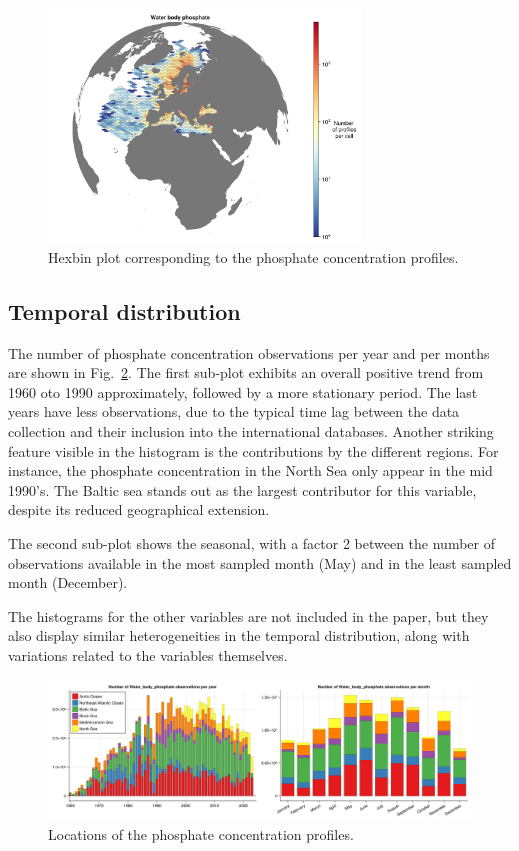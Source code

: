 \documentclass[essd,manuscript]{copernicus}
\begin{document}
\begin{figure}[t]
\includegraphics[width=8.3cm]{observations_Water_body_phosphate_hex.png}
\caption{Hexbin plot corresponding to the phosphate concentration profiles.\label{fig:phosphatedatahexbin}}
\end{figure}

\subsection{Temporal distribution}

The number of phosphate concentration observations per year and per months are shown in Fig.~\ref{fig:phosphatetime}. The first sub-plot exhibits an overall positive trend from 1960 oto 1990 approximately, followed by a more stationary period. The last years have less observations, due to the typical time lag between the data collection and their inclusion into the international databases. Another striking feature visible in the histogram is the contributions by the different regions. For instance, the phosphate concentration in the North Sea only appear in the mid 1990's. The Baltic sea stands out as the largest contributor for this variable, despite its reduced geographical extension.

The second sub-plot shows the seasonal, with a factor 2 between the number of observations available in the most sampled month (May) and in the least sampled month (December). 

The histograms for the other variables are not included in the paper, but they also display similar heterogeneities in the temporal distribution, along with variations related to the variables themselves. 

\begin{figure}[t]
\centering
\includegraphics[width=\textwidth]{stacked_histogram_Water_body_phosphate.png}
\caption{Locations of the phosphate concentration profiles.\label{fig:phosphatetime}}
\end{figure}
\end{document}
